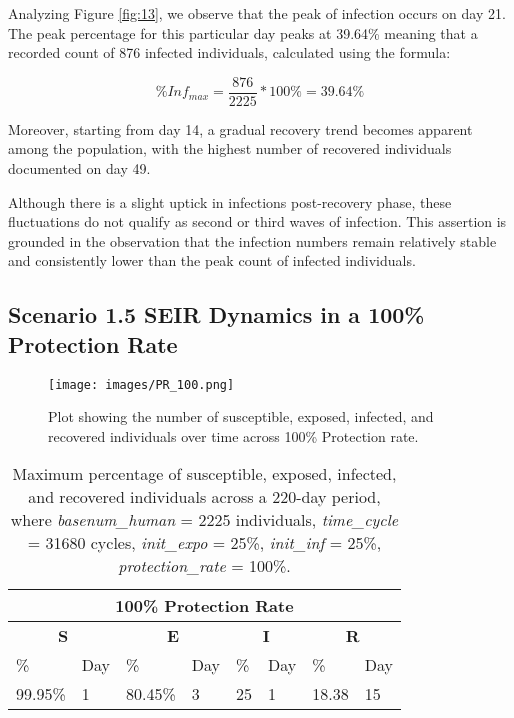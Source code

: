Analyzing Figure \ref{fig:13}, we observe that the peak of infection occurs on day 21. The peak percentage for this particular day peaks at 39.64\% meaning that a recorded count of 876 infected individuals, calculated using the formula:

\[ \%Inf_{max}  = \frac{876}{2225} * 100\% = 39.64\% \]

Moreover, starting from day 14, a gradual recovery trend becomes apparent among the population, with the highest number of recovered individuals documented on day 49.

Although there is a slight uptick in infections post-recovery phase, these fluctuations do not qualify as second or third waves of infection. This assertion is grounded in the observation that the infection numbers remain relatively stable and consistently lower than the peak count of infected individuals.

\subsection{ Scenario 1.5 SEIR Dynamics in a 100\% Protection Rate}

\begin{figure}[H]
	\centering
	\texttt{[image: images/PR\_100.png]}
	\caption{Plot showing the number of susceptible, exposed, infected, and recovered individuals over time across 100\% Protection rate. }
	\label{fig:14}
\end{figure}

\begin{table} [H]
	\centering
	\begin{tabular}{|l|l|l|l|l|l|l|l|}
		\hline
		\multicolumn{8}{|c|}{\textbf{100\% Protection Rate}}\\
		\hline
		\multicolumn{2}{|c|}{\textbf{S}} &  \multicolumn{2}{c|}{\textbf{E}}&  \multicolumn{2}{c|}{\textbf{I}}&  \multicolumn{2}{c|}{\textbf{R}}\\
		\hline
		\%& Day & \% & Day & \%  & Day & \% & Day \\
		\hline
		99.95\% & 1 &80.45\%  & 3 &  25  & 1 & 18.38  &15\\
		\hline
	\end{tabular}
	\caption{Maximum percentage of susceptible, exposed, infected, and recovered individuals across a 220-day period, where \textit{basenum\_human} = 2225 individuals, \textit{time\_cycle} = 31680 cycles, \textit{init\_expo} = 25\%, \textit{init\_inf} = 25\%,  \textit{protection\_rate} = 100\%.}
	\label{PR5_Max}
\end{table}


